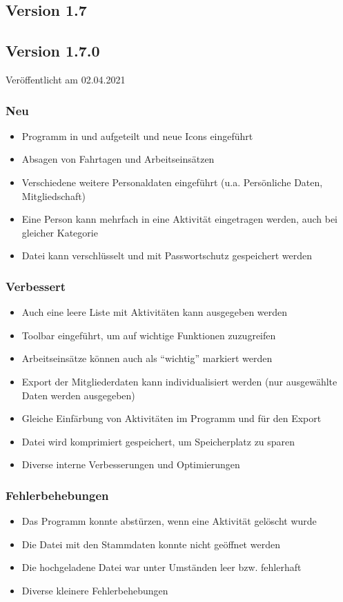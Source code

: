 \begin{neu}
\section{Version 1.7}\label{version:1:6}
\subsection{Version 1.7.0}
\label{version:1:7:0}
Veröffentlicht am 02.04.2021
\subsubsection{Neu}
\begin{itemize}
  \item
  Programm in \Einsatz und \Personal aufgeteilt und neue Icons eingeführt
  \item
  Absagen von Fahrtagen und Arbeitseinsätzen
  \item
  Verschiedene weitere Personaldaten eingeführt (u.a. Persönliche Daten, Mitgliedschaft)
  \item
  Eine Person kann mehrfach in eine Aktivität eingetragen werden, auch bei gleicher Kategorie
  \item
  Datei kann verschlüsselt und mit Passwortschutz gespeichert werden

\end{itemize}

\subsubsection{Verbessert}
\begin{itemize}
  \item
  Auch eine leere Liste mit Aktivitäten kann ausgegeben werden
  \item
  Toolbar eingeführt, um auf wichtige Funktionen zuzugreifen
  \item
  Arbeitseinsätze können auch als "`wichtig"' markiert werden
  \item
  Export der Mitgliederdaten kann individualisiert werden (nur ausgewählte Daten werden ausgegeben)
  \item
  Gleiche Einfärbung von Aktivitäten im Programm und für den Export
  \item
  Datei wird komprimiert gespeichert, um Speicherplatz zu sparen
  \item
  Diverse interne Verbesserungen und Optimierungen
\end{itemize}

\subsubsection{Fehlerbehebungen}
\begin{itemize}
  \item
  Das Programm konnte abstürzen, wenn eine Aktivität gelöscht wurde
  \item
  Die Datei mit den Stammdaten konnte nicht geöffnet werden
  \item
  Die hochgeladene Datei war unter Umständen leer bzw. fehlerhaft
  \item
  Diverse kleinere Fehlerbehebungen
\end{itemize}
\end{neu}
